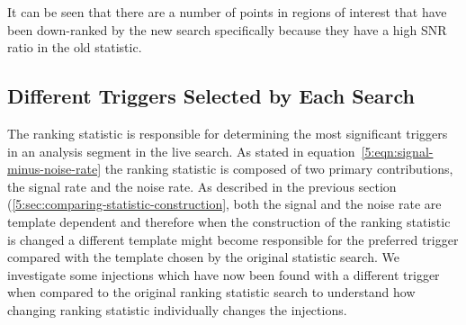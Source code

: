 %
It can be seen that there are a number of points in regions of interest that have been down-ranked by the new search specifically because they have a high SNR ratio in the old statistic.


\subsection{\label{5:sec:diff-triggers}Different Triggers Selected by Each Search}

The ranking statistic is responsible for determining the most significant triggers in an analysis segment in the live search. As stated in equation~\ref{5:eqn:signal-minus-noise-rate} the ranking statistic is composed of two primary contributions, the signal rate and the noise rate. As described in the previous section (\ref{5:sec:comparing-statistic-construction}, both the signal and the noise rate are template dependent and therefore when the construction of the ranking statistic is changed a different template might become responsible for the preferred trigger compared with the template chosen by the original statistic search. We investigate some injections which have now been found with a different trigger when compared to the original ranking statistic search to understand how changing ranking statistic individually changes the injections.


